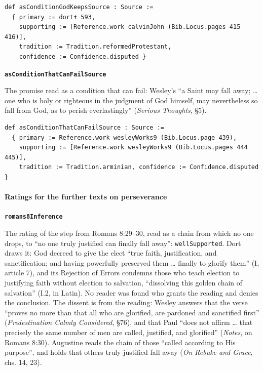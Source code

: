 \documentclass[11pt]{article}
\begin{document}
{\small\begin{verbatim}
def asConditionGodKeepsSource : Source :=
  { primary := dort✝ 593,
    supporting := [Reference.work calvinJohn (Bib.Locus.pages 415 416)],
    tradition := Tradition.reformedProtestant,
    confidence := Confidence.disputed }
\end{verbatim}}
\par\medskip\noindent\textbf{\texttt{as\allowbreak{}Condition\allowbreak{}That\allowbreak{}Can\allowbreak{}Fail\allowbreak{}Source}}\par\nobreak\noindent
The promise read as a condition that can fail: Wesley’s “a Saint may fall away; … one who is holy or righteous in the judgment of God himself, may nevertheless so fall from God, as to perish everlastingly” (\emph{Serious Thoughts}, §5).

{\small\begin{verbatim}
def asConditionThatCanFailSource : Source :=
  { primary := Reference.work wesleyWorks9 (Bib.Locus.page 439),
    supporting := [Reference.work wesleyWorks9 (Bib.Locus.pages 444 445)],
    tradition := Tradition.arminian, confidence := Confidence.disputed }
\end{verbatim}}
\paragraph*{Ratings for the further texts on perseverance}
\leavevmode\par\nobreak
\par\medskip\noindent\textbf{\texttt{romans8\allowbreak{}Inference}}\par\nobreak\noindent
The rating of the step from Romans 8:29–30, read as a chain from which no one drops, to “no one truly justified can finally fall away”: \texttt{well\allowbreak{}Supported}. Dort draws it: God decreed to give the elect “true faith, justification, and sanctification; and having powerfully preserved them … finally to glorify them” (I, article 7), and its Rejection of Errors condemns those who teach election to justifying faith without election to salvation, “dissolving this golden chain of salvation” (I.2, in Latin). No reader was found who grants the reading and denies the conclusion. The dissent is from the reading: Wesley answers that the verse “proves no more than that all who are glorified, are pardoned and sanctified first” (\emph{Predestination Calmly Considered}, §76), and that Paul “does not affirm … that precisely the same number of men are called, justified, and glorified” (\emph{Notes}, on Romans 8:30). Augustine reads the chain of those “called according to His purpose”, and holds that others truly justified fall away (\emph{On Rebuke and Grace}, chs. 14, 23).
\end{document}
